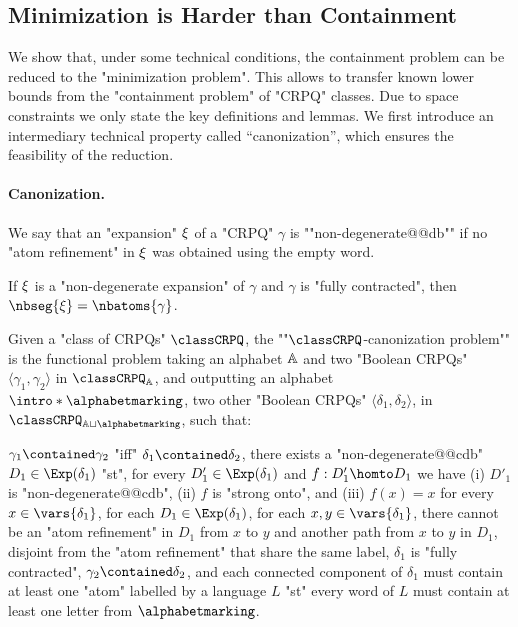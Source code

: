 \subsection{Minimization is Harder than Containment}
We show that, under some technical conditions, the containment problem can be reduced to the "minimization problem". This allows to transfer known lower bounds from the "containment problem" of "CRPQ" classes. Due to space constraints we only state the key definitions and lemmas.
We first introduce an intermediary technical property called ``canonization'',
which ensures the feasibility of the reduction.

\paragraph*{Canonization.}
We say that an "expansion" $\xi$ of a "CRPQ" $\gamma$ is \AP""non-degenerate@@db""
if no "atom refinement" in $\xi$ was obtained using the empty word.

\begin{fact}
	\AP\label{fact:nb-seg-expansion}
	If $\xi$ is a "non-degenerate expansion" of $\gamma$ and
	$\gamma$ is "fully contracted", then $\nbseg{\anexpansion} = \nbatoms{\gamma}$.
\end{fact}

Given a "class of CRPQs" $\classCRPQ$, the \AP""$\classCRPQ$-canonization problem""
is the functional problem taking an alphabet $\mathbb{A}$
and two "Boolean CRPQs" $\langle \gamma_1,\gamma_2\rangle$ in $\classCRPQ_{\A}$,
and outputting an alphabet \AP$\intro*\alphabetmarking$, two other "Boolean CRPQs" $\langle \delta_1, \delta_2 \rangle$, in $\classCRPQ_{\A\sqcup \alphabetmarking}$,
such that:
\begin{description}
	\itemAP[\intro*\axiomCanonMonotonicity{}:] \axiomsCanon
		$\gamma_1 \contained \gamma_2$ "iff" $\delta_1 \contained \delta_2$,
	\itemAP[\intro*\axiomCanonCore{}:]
		there exists a "non-degenerate@@cdb" 
		$D_1 \in \Exp(\delta_1)$ "st", for every $D'_1 \in \Exp(\delta_1)$ and $f: D'_1 \homto D_1$ we have (i) $D'_1$ is "non-degenerate@@cdb", (ii) $f$ is "strong onto", and (iii)  $f(x)=x$ for every $x\in \vars{\delta_1}$,
	\itemAP[\intro*\axiomCanonNonRed{}:] for each $D_1 \in \Exp(\delta_1)$,
		for each $x,y \in \vars{\delta_1}$, there cannot be an "atom refinement" in $D_1$
		from $x$ to $y$ and another path from $x$ to $y$ in $D_1$, disjoint from the "atom refinement" that share the same label,
	\itemAP[\intro*\axiomCanonContracted{}:] $\delta_1$ is "fully contracted",
	\itemAP[\intro*\axiomCanonContainment{}:] $\gamma_2 \contained \delta_2$, and 
	\itemAP[\intro*\axiomCanonMarking{}:] each connected component of $\delta_1$ must contain at least one "atom"
	labelled by a language $L$ "st" every word of $L$ must contain at least one letter from $\alphabetmarking$.
\end{description}

